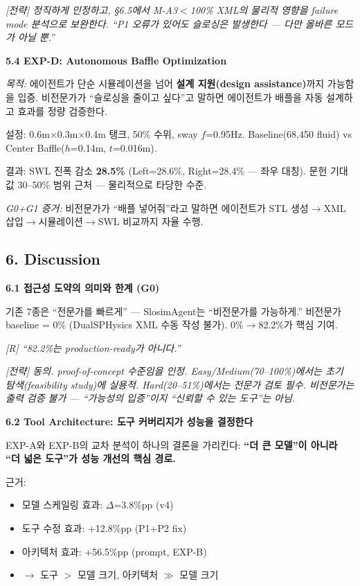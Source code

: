 \documentclass[12pt,a4paper]{article}
\begin{document}
{\color{strategy}\textit{[전략] 정직하게 인정하고, §6.5에서 M-A3$<$100\% XML의
물리적 영향을 failure mode 분석으로 보완한다.
``P1 오류가 있어도 슬로싱은 발생한다 --- 다만 올바른 모드가 아닐 뿐.''}}

\textbf{5.4 EXP-D: Autonomous Baffle Optimization}

\textit{목적:} 에이전트가 단순 시뮬레이션을 넘어
\textbf{설계 지원(design assistance)}까지 가능함을 입증.
비전문가가 ``슬로싱을 줄이고 싶다''고 말하면
에이전트가 배플을 자동 설계하고 효과를 정량 검증한다.

설정: 0.6m$\times$0.3m$\times$0.4m 탱크, 50\% 수위, sway $f$=0.95Hz.
Baseline(68,450 fluid) vs Center Baffle($h$=0.14m, $t$=0.016m).

결과: SWL 진폭 감소 \textbf{28.5\%} (Left=28.6\%, Right=28.4\% --- 좌우 대칭).
문헌 기대값 30--50\% 범위 근처 --- 물리적으로 타당한 수준.

\textit{G0+G1 증거:} 비전문가가 ``배플 넣어줘''라고 말하면
에이전트가 STL 생성$\rightarrow$XML 삽입$\rightarrow$시뮬레이션$\rightarrow$SWL 비교까지 자율 수행.

\subsection{6. Discussion}

\textbf{6.1 접근성 도약의 의미와 한계 (G0)}

기존 7종은 ``전문가를 빠르게'' --- SlosimAgent는 ``비전문가를 가능하게.''
비전문가 baseline = 0\% (DualSPHysics XML 수동 작성 불가).
0\%$\rightarrow$82.2\%가 핵심 기여.

{\color{reviewer}\textit{[R] ``82.2\%는 production-ready가 아니다.''}}

{\color{strategy}\textit{[전략] 동의. proof-of-concept 수준임을 인정.
Easy/Medium(70--100\%)에서는 초기 탐색(feasibility study)에 실용적.
Hard(20--51\%)에서는 전문가 검토 필수.
비전문가는 출력 검증 불가 --- ``가능성의 입증''이지 ``신뢰할 수 있는 도구''는 아님.}}

\textbf{6.2 Tool Architecture: 도구 커버리지가 성능을 결정한다}

EXP-A와 EXP-B의 교차 분석이 하나의 결론을 가리킨다:
\textbf{``더 큰 모델''이 아니라 ``더 넓은 도구''가 성능 개선의 핵심 경로.}

근거:
\begin{itemize}[nosep]
\item 모델 스케일링 효과: $\Delta$=3.8\%pp (v4)
\item 도구 수정 효과: +12.8\%pp (P1+P2 fix)
\item 아키텍처 효과: +56.5\%pp (prompt, EXP-B)
\item $\rightarrow$ 도구 $>$ 모델 크기, 아키텍처 $\gg$ 모델 크기
\end{itemize}
\end{document}
